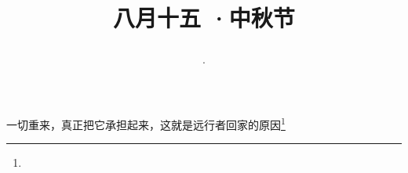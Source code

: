 \title{\date[d=17,m=9,y=2024][year:cn-y,年,month:cn,day:cn,日,·,weekday]·八月十五 ·中秋节}
一切重来，真正把它承担起来，这就是远行者回家的原因\footnote{ }

